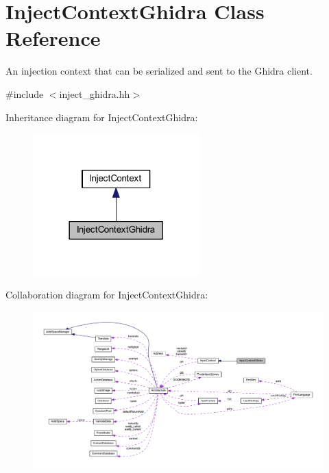 \hypertarget{class_inject_context_ghidra}{}\section{Inject\+Context\+Ghidra Class Reference}
\label{class_inject_context_ghidra}


An injection context that can be serialized and sent to the Ghidra client.  




{\ttfamily \#include $<$inject\+\_\+ghidra.\+hh$>$}



Inheritance diagram for Inject\+Context\+Ghidra\+:
\nopagebreak
\begin{figure}[H]
\begin{center}
\leavevmode
\includegraphics[width=182pt]{class_inject_context_ghidra__inherit__graph}
\end{center}
\end{figure}


Collaboration diagram for Inject\+Context\+Ghidra\+:
\nopagebreak
\begin{figure}[H]
\begin{center}
\leavevmode
\includegraphics[width=350pt]{class_inject_context_ghidra__coll__graph}
\end{center}
\end{figure}
